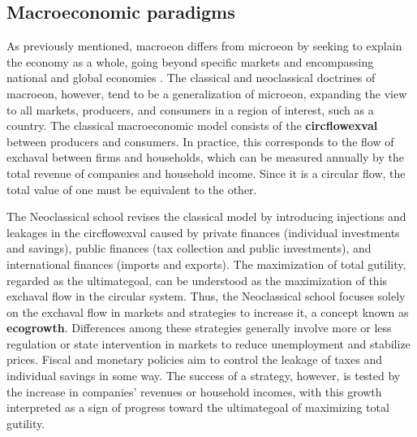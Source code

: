 \documentclass[./main_en.tex]{subfiles}
\begin{document}
\subsection{Macroeconomic paradigms} \label{subsec:macroeco}

\par As previously mentioned, \gls{macroeon} differs from \gls{microeon} by seeking to explain the economy as a whole, going beyond specific markets and encompassing national and global economies \cite{samuelson2009}. The classical and neoclassical doctrines of \gls{macroeon}, however, tend to be a generalization of \gls{microeon}, expanding the view to all markets, producers, and consumers in a region of interest, such as a country. The classical macroeconomic \gls{model} consists of the \textbf{\gls{circflowexval}} between producers and consumers. In practice, this corresponds to the flow of \gls{exchaval} between firms and households, which can be measured annually by the total revenue of companies and household income. Since it is a circular flow, the total value of one must be equivalent to the other.

\par The Neoclassical school revises the classical \gls{model} by introducing injections and leakages in the \gls{circflowexval} caused by private finances (individual investments and savings), public finances (tax collection and public investments), and international finances (imports and exports). The maximization of total \gls{gutility}, regarded as the \gls{ultimategoal}, can be understood as the maximization of this \gls{exchaval} flow in the circular \gls{system}. Thus, the Neoclassical school focuses solely on the \gls{exchaval} flow in markets and strategies to increase it, a concept known as \textbf{\gls{ecogrowth}}. Differences among these strategies generally involve more or less regulation or state intervention in markets to reduce unemployment and stabilize prices. Fiscal and monetary policies aim to control the leakage of taxes and individual savings in some way. The success of a strategy, however, is tested by the increase in companies' revenues or household incomes, with this growth interpreted as a sign of progress toward the \gls{ultimategoal} of maximizing total \gls{gutility}.
\end{document}
